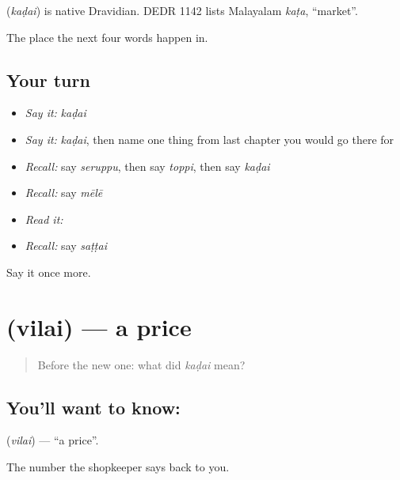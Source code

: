 \begin{cousinweb}
\textbf{} (\emph{kaḍai}) is native Dravidian. DEDR 1142 lists Malayalam \emph{kaṭa}, \textquotedblleft{}market\textquotedblright{}.
\end{cousinweb}

\begin{grammarlens}[title={What you've built}]
The place the next four words happen in.
\end{grammarlens}

\subsection*{Your turn}
\begin{itemize}
\raggedright
  \item \emph{Say it:} \emph{kaḍai}
  \item \emph{Say it:} \emph{kaḍai}, then name one thing from last chapter you would go there for
  \item \emph{Recall:} say \emph{seruppu}, then say \emph{toppi}, then say \emph{kaḍai}
  \item \emph{Recall:} say \emph{mēlē}
  \item \emph{Read it:} \textbf{}
  \item \emph{Recall:} say \emph{saṭṭai}
\end{itemize}

\begin{tcolorbox}[breakable,colback=teal!4,colframe=teal!35!black,title={Before you move on}]
Say it once more.
\end{tcolorbox}
\section[\texorpdfstring{\ta{விலை} (vilai)}{விலை (vilai)}]{ (vilai) — a price}

\label{lesson:TA-C68-price}



\begin{quote}
Before the new one: what did \emph{kaḍai} mean?
\end{quote}

\subsection*{You'll want to know: }
\textbf{} (\emph{vilai}) — \textquotedblleft{}a price\textquotedblright{}.

The number the shopkeeper says back to you.

